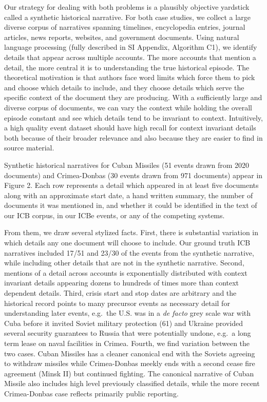 \documentclass[9pt,twocolumn,twoside,lineno]{pnas-new}
\begin{document}
Our strategy for dealing with both problems is a plausibly objective
yardstick called a synthetic historical narrative. For both case
studies, we collect a large diverse corpus of narratives spanning
timelines, encyclopedia entries, journal articles, news reports,
websites, and government documents. Using natural language processing
(fully described in SI Appendix, Algorithm C1), we identify details that
appear across multiple accounts. The more accounts that mention a
detail, the more central it is to understanding the true historical
episode. The theoretical motivation is that authors face word limits
which force them to pick and choose which details to include, and they
choose details which serve the specific context of the document they are
producing. With a sufficiently large and diverse corpus of documents, we
can vary the context while holding the overall episode constant and see
which details tend to be invariant to context. Intuitively, a high
quality event dataset should have high recall for context invariant
details both because of their broader relevance and also because they
are easier to find in source material.

Synthetic historical narratives for Cuban Missiles (51 events drawn from
2020 documents) and Crimea-Donbas (30 events drawn from 971 documents)
appear in Figure 2. Each row represents a detail which appeared in at
least five documents along with an approximate start date, a hand
written summary, the number of documents it was mentioned in, and
whether it could be identified in the text of our ICB corpus, in our
ICBe events, or any of the competing systems.

From them, we draw several stylized facts. First, there is substantial
variation in which details any one document will choose to include. Our
ground truth ICB narratives included 17/51 and 23/30 of the events from
the synthetic narrative, while including other details that are not in
the synthetic narrative. Second, mentions of a detail across accounts is
exponentially distributed with context invariant details appearing
dozens to hundreds of times more than context dependent details. Third,
crisis start and stop dates are arbitrary and the historical record
points to many precursor events as necessary detail for understanding
later events, e.g.~the U.S. was in a \textit{de facto} grey scale war
with Cuba before it invited Soviet military protection (61) and Ukraine
provided several security guarantees to Russia that were potentially
undone, e.g.~a long term lease on naval facilities in Crimea. Fourth, we
find variation between the two cases. Cuban Missiles has a cleaner
canonical end with the Soviets agreeing to withdraw missiles while
Crimea-Donbas meekly ends with a second cease fire agreement (Minsk II)
but continued fighting. The canonical narrative of Cuban Missile also
includes high level previously classified details, while the more recent
Crimea-Donbas case reflects primarily public reporting.
\end{document}
